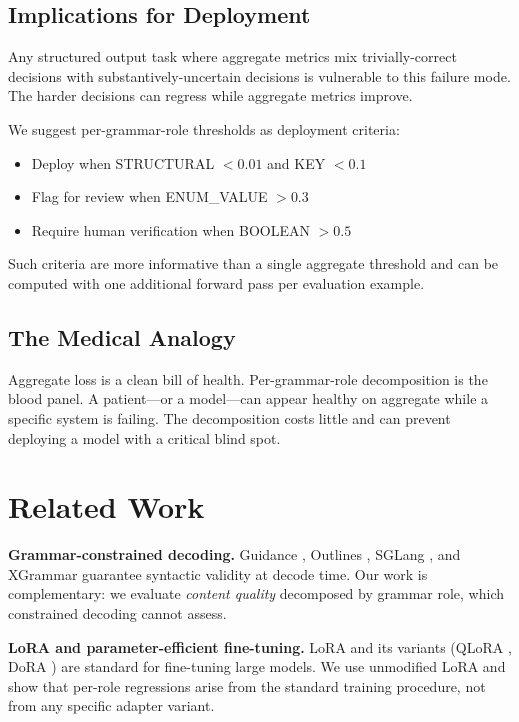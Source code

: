 \documentclass[11pt]{article}
\begin{document}
\subsection{Implications for Deployment}

Any structured output task where aggregate metrics mix trivially-correct decisions with substantively-uncertain decisions is vulnerable to this failure mode. The harder decisions can regress while aggregate metrics improve.

We suggest per-grammar-role thresholds as deployment criteria:
\begin{itemize}
\item Deploy when STRUCTURAL $< 0.01$ and KEY $< 0.1$
\item Flag for review when ENUM\_VALUE $> 0.3$
\item Require human verification when BOOLEAN $> 0.5$
\end{itemize}

Such criteria are more informative than a single aggregate threshold and can be computed with one additional forward pass per evaluation example.

\subsection{The Medical Analogy}

Aggregate loss is a clean bill of health. Per-grammar-role decomposition is the blood panel. A patient---or a model---can appear healthy on aggregate while a specific system is failing. The decomposition costs little and can prevent deploying a model with a critical blind spot.

\section{Related Work}

\textbf{Grammar-constrained decoding.} Guidance \cite{guidance2024}, Outlines \cite{willard2023outlines}, SGLang \cite{zheng2024sglang}, and XGrammar \cite{xgrammar2024} guarantee syntactic validity at decode time. Our work is complementary: we evaluate \emph{content quality} decomposed by grammar role, which constrained decoding cannot assess.

\textbf{LoRA and parameter-efficient fine-tuning.} LoRA \cite{hu2021lora} and its variants (QLoRA \cite{dettmers2023qlora}, DoRA \cite{liu2024dora}) are standard for fine-tuning large models. We use unmodified LoRA and show that per-role regressions arise from the standard training procedure, not from any specific adapter variant.
\end{document}

